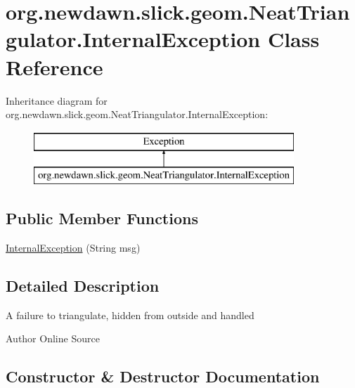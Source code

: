 \hypertarget{classorg_1_1newdawn_1_1slick_1_1geom_1_1_neat_triangulator_1_1_internal_exception}{}\section{org.\+newdawn.\+slick.\+geom.\+Neat\+Triangulator.\+Internal\+Exception Class Reference}
\label{classorg_1_1newdawn_1_1slick_1_1geom_1_1_neat_triangulator_1_1_internal_exception}
Inheritance diagram for org.\+newdawn.\+slick.\+geom.\+Neat\+Triangulator.\+Internal\+Exception\+:\begin{figure}[H]
\begin{center}
\leavevmode
\includegraphics[height=2.000000cm]{classorg_1_1newdawn_1_1slick_1_1geom_1_1_neat_triangulator_1_1_internal_exception}
\end{center}
\end{figure}
\subsection*{Public Member Functions}
\begin{DoxyCompactItemize}
\item 
\mbox{\hyperlink{classorg_1_1newdawn_1_1slick_1_1geom_1_1_neat_triangulator_1_1_internal_exception_a50dc57980fb894d7abc7145cd1531e42}{Internal\+Exception}} (String msg)
\end{DoxyCompactItemize}


\subsection{Detailed Description}
A failure to triangulate, hidden from outside and handled

\begin{DoxyAuthor}{Author}
Online Source 
\end{DoxyAuthor}


\subsection{Constructor \& Destructor Documentation}
\mbox{\label{classorg_1_1newdawn_1_1slick_1_1geom_1_1_neat_triangulator_1_1_internal_exception_a50dc57980fb894d7abc7145cd1531e42}} 
